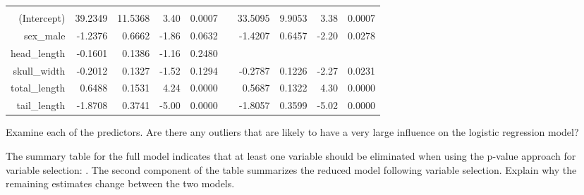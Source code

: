 {\begin{center}
\begin{tabular}{r rrrr r rrrr}
  \hline
\vspace{-3.1mm} \\
(Intercept)                 & 39.2349 & 11.5368 & 3.40  & 0.0007 &
                            & 33.5095 & 9.9053  & 3.38  & 0.0007 \\ 
sex\_\hspace{0.3mm}male     & -1.2376 & 0.6662  & -1.86 & 0.0632 &
                            & -1.4207 & 0.6457  & -2.20 & 0.0278 \\ 
head\_\hspace{0.3mm}length  & -0.1601 & 0.1386  & -1.16 & 0.2480 \\ 
skull\_\hspace{0.3mm}width  & -0.2012 & 0.1327  & -1.52 & 0.1294 &
                            & -0.2787 & 0.1226  & -2.27 & 0.0231 \\ 
total\_\hspace{0.3mm}length & 0.6488  & 0.1531  & 4.24  & 0.0000 &
                            & 0.5687  & 0.1322  & 4.30  & 0.0000 \\ 
tail\_\hspace{0.3mm}length  & -1.8708 & 0.3741  & -5.00 & 0.0000 &
                            & -1.8057 & 0.3599  & -5.02 & 0.0000 \\ 
  \hline
\end{tabular}
\end{center}
\begin{parts}
\item Examine each of the predictors. Are there any outliers that are likely to 
have a very large influence on the logistic regression model?
\item The summary table for the full model indicates that at least one variable 
should be eliminated when using the p-value approach for variable selection: 
. The second component of the table summarizes 
the reduced model following variable selection. Explain why the remaining estimates 
change between the two models.
\end{parts}
}{}


